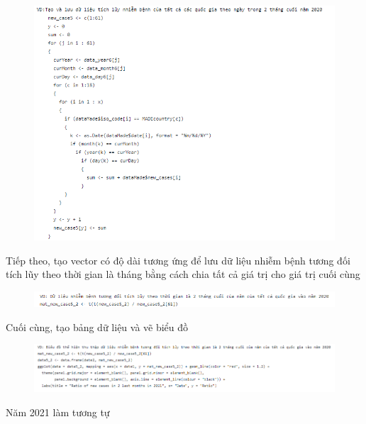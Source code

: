 \documentclass[a4paper]{article}
\theoremstyle{definition}
\begin{document}
\begin{enumerate}[i)]
\begin{enumerate}[1]
\begin{figure}[H]
				\includegraphics[scale=0.8]{images/7.0.6.png}
			\end{figure}
			Tiếp theo, tạo vector có độ dài tương ứng để lưu dữ liệu nhiễm bệnh tương đối tích lũy theo thời gian là tháng bằng cách chia tất cả giá trị cho giá trị cuối cùng
			\begin{figure}[H]
				\centering
				\includegraphics[scale=0.8]{images/7.0.7.png}
			\end{figure}
			Cuối cùng, tạo bảng dữ liệu và vẽ biểu đồ
			\begin{figure}[H]
				\centering
				\includegraphics[scale=0.7]{images/7.0.8.png}
			\end{figure}
			Năm 2021 làm tương tự
			\begin{figure}[H]
				\centering

\end{figure}
\end{enumerate}
\end{enumerate}
\end{document}
